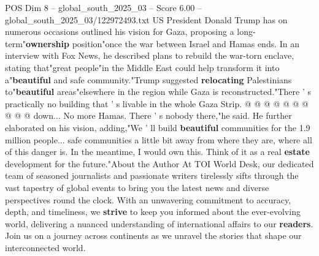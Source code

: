\begin{textsample}{POS Dim 8 – global\_south\_2025\_03 – Score 6.00 – global\_south\_2025\_03/122972493.txt}
US President Donald Trump has on numerous occasions outlined his vision for Gaza, proposing a long-term"\textbf{ownership} position"once the war between Israel and Hamas ends.
In an interview with Fox News, he described plans to rebuild the war-torn enclave, stating that"great people"in the Middle East could help transform it into a"\textbf{beautiful} and safe community."Trump suggested \textbf{relocating} Palestinians to"\textbf{beautiful} areas"elsewhere in the region while Gaza is reconstructed."There ' s practically no building that ' s livable in the whole Gaza Strip. @ @ @ @ @ @ @ @ @ @ down...
No more Hamas.
There ' s nobody there,"he said.
He further elaborated on his vision, adding,"We ' ll build \textbf{beautiful} communities for the 1.9 million people... safe communities a little bit away from where they are, where all of this danger is.
In the meantime, I would own this.
Think of it as a real \textbf{estate} development for the future."About the Author At TOI World Desk, our dedicated team of seasoned journalists and passionate writers tirelessly sifts through the vast tapestry of global events to bring you the latest news and diverse perspectives round the clock.
With an unwavering commitment to accuracy, depth, and timeliness, we \textbf{strive} to keep you informed about the ever-evolving world, delivering a nuanced understanding of international affairs to our \textbf{readers}.
Join us on a journey across continents as we unravel the stories that shape our interconnected world.

\end{textsample}
